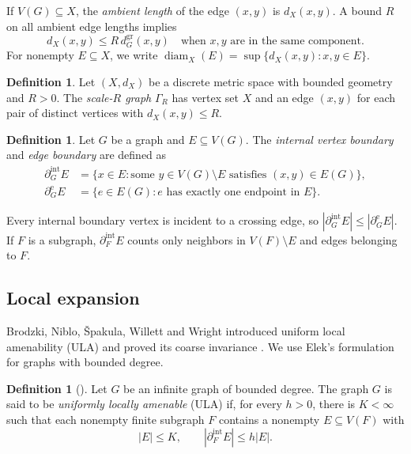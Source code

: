 \documentclass[11pt,a4paper]{article}
\theoremstyle{definition}\newtheorem{definition}[theorem]{Definition}
\theoremstyle{remark}\newtheorem{remark}[theorem]{Remark}
\begin{document}
If $V(G)\subseteq X$, the \emph{ambient length} of the edge
$(x,y)$ is $d_X(x,y)$. A bound $R$ on all ambient edge lengths
implies
$$
d_X(x,y)\le R\,d_G^{\mathrm{gr}}(x,y)
\quad\text{when $x,y$ are in the same component}.
$$
For nonempty $E\subseteq X$, we write
$\operatorname{diam}_X(E)=\sup\{d_X(x,y):x,y\in E\}$.


\begin{definition}\label{def:scale-graph}
Let $(X,d_X)$ be a discrete metric space with bounded geometry and $R>0$.
The \emph{scale-$R$ graph} $\Gamma_R$ has vertex set $X$ and an
edge $(x,y)$ for each pair of distinct vertices with $d_X(x,y)\le R$.
\end{definition}



\begin{definition}\label{def:graphboundary}
Let $G$ be a graph and $E\subseteq V(G)$. The \emph{internal vertex boundary} and \emph{edge boundary} are defined as
\begin{equation*}
\begin{split}
\partial_G^{\mathrm{int}}E
&=\{x\in E:\text{some }y\in V(G)\setminus E
                         \text{ satisfies }(x,y)\in E(G)\},\\
\partial_G^{\mathrm e}E
&=\{e\in E(G):e\text{ has exactly one endpoint in }E\}.
\end{split}
\end{equation*}
\end{definition}
Every internal boundary vertex is incident to a crossing edge, so $|\partial_G^{\mathrm{int}}E|\le|\partial_G^{\mathrm e}E|$.
If $F$ is a subgraph, $\partial_F^{\mathrm{int}}E$ counts only
neighbors in $V(F)\setminus E$ and edges belonging to $F$.



\subsection{Local expansion}

Brodzki, Niblo, \v{S}pakula, Willett and Wright introduced uniform
local amenability (ULA) and proved its coarse invariance
\cite[Definition 2.2 and Lemma 2.6]{BNSWW}. We use Elek's formulation
\cite{Elek,ElekTimar} for graphs with bounded degree.

\begin{definition}[{\cite[Definition 1.2]{Elek}}]\label{def:ULA}
Let $G$ be an infinite graph of bounded degree. The graph $G$ is said to be \emph{uniformly locally amenable} (ULA)
if, for every $h>0$, there is $K<\infty$ such that each nonempty finite subgraph $F$ contains a nonempty $E\subseteq V(F)$ with
$$
|E|\le K,\qquad |\partial_F^{\mathrm{int}}E|\le h|E|.
$$
\end{definition}
\end{document}
